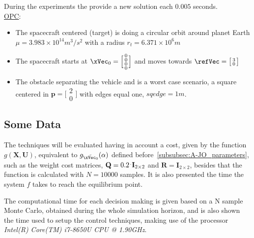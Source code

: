 During the experiments the  provide a new solution each \(0.005\) seconds.\\


\underline{OPC}:
\label{ssssec:OPC} %
\begin{itemize}
  \item The  spacecraft centered (target) is doing a circular orbit around planet Earth \(\mu = 3.983 \times 10^{14} m^3/s^{2}\) with a radius \(r_t = 6.371 \times 10^6 m\)
  \item The spacecraft starts at \(\xVec_0 = \Bigl[\begin{smallmatrix} 0 \\ 0 \\ 0 \\ 0  \end{smallmatrix}\Bigr]\) and moves towards \(\refVec = \bigl[\begin{smallmatrix} 3 \\ 0 \end{smallmatrix}\bigr]\)
  \item The obstacle separating the vehicle and \txtref is a worst case scenario, a square centered in \(\mathbf{p} = \bigl[\begin{smallmatrix} 2 \\ 0 \end{smallmatrix}\bigr] \) with edges equal one, \(sqedge = 1 m\).
\end{itemize}



\subsection{Some Data}
\label{subsec:some_data}

The techniques will be evaluated having in account a cost, given by the function \(g(\mathbf{X}, \mathbf{U})\), equivalent to \(g_{\bar{\xVec_0}}(\alpha)\) defined before~\ref{subsubsec:A-JO_parameters}, such as the weight cost matrices, \(\mathbf{Q} = 0.2 \hspace{0.1em}^. \mathbf{I}_{2\times 2} \) and \(\mathbf{R} = \mathbf{I}_{2\times 2} \), besides that the function is calculated with \(N=10000\) samples. It is also presented the time the system \(f\) takes to reach the equilibrium point.\par
The computational time for each decision making is given based on a N sample Monte Carlo, obtained during the whole simulation horizon, and is also shown the time used to setup the control techniques, making use of the processor \emph{Intel(R) Core(TM) i7-8650U CPU @ 1.90GHz}.



